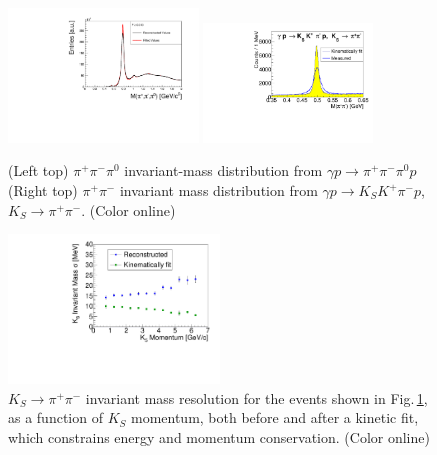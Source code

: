 \begin{figure}[tpb]
\begin{center}
\includegraphics[width=0.45\textwidth]{figures/omega_inv_mass_probCut_001.pdf}
\includegraphics[width=0.4\textwidth]{figures/kskpi_mass_spect.pdf}
\caption{\label{fig:invmass1}
(Left top) $\pi^+\pi^-\pi^0$ invariant-mass distribution from $\gamma p \to \pi^+\pi^-\pi^0 p$ (Right top) $\pi^+\pi^-$ invariant mass distribution from $\gamma p \to K_S K^+ \pi^- p$, $K_S\to\pi^+\pi^-$. (Color online)}
\end{center}
\end{figure}


\begin{figure}[tpb]
\begin{center}\includegraphics[width=0.5\textwidth]{figures/kskpi_mass_resol.pdf}
\caption{\label{fig:invmass1a}
$K_S\to\pi^+\pi^-$ invariant mass resolution for the events shown in Fig.\,\ref{fig:invmass1}, as a function of $K_S$ momentum, both before and after a kinetic fit, which constrains energy and momentum conservation.  
(Color online)}
\end{center}
\end{figure}


